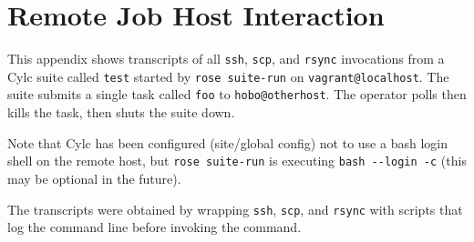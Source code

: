 \section{Remote Job Host Interaction}

\lstset{language=jobhosts}

This appendix shows transcripts of all \lstinline=ssh=, \lstinline=scp=, and
\lstinline=rsync= invocations from a Cylc suite called \lstinline=test= started by
\lstinline=rose suite-run= on \lstinline=vagrant@localhost=. The suite
submits a single task called \lstinline=foo= to \lstinline=hobo@otherhost=.
The operator polls then kills the task, then shuts the suite down.

Note that Cylc has been configured (site/global config) not to use a bash login
shell on the remote host, but \lstinline=rose suite-run= is executing
\lstinline=bash --login -c= (this may be optional in the future).

The transcripts were obtained by wrapping \lstinline=ssh=, \lstinline=scp=, and
\lstinline=rsync= with scripts that log the command line before invoking the
command.

